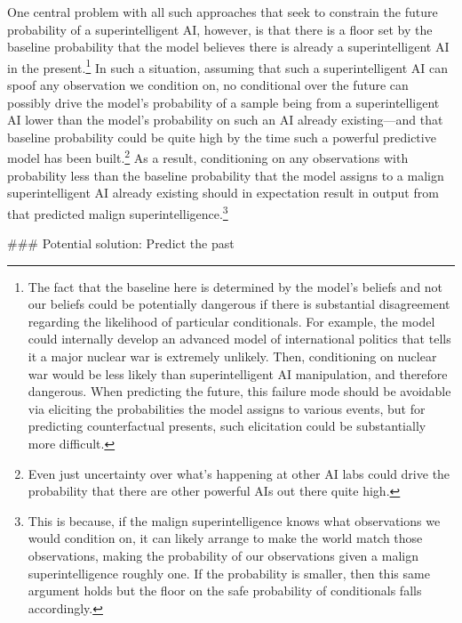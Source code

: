{One central problem with all such approaches that seek to constrain the future probability of a superintelligent AI, however, is that there is a floor set by the baseline probability that the model believes there is already a superintelligent AI in the present.\footnote{The fact that the baseline here is determined by the model's beliefs and not our beliefs could be potentially dangerous if there is substantial disagreement regarding the likelihood of particular conditionals. For example, the model could internally develop an advanced model of international politics that tells it a major nuclear war is extremely unlikely. Then, conditioning on nuclear war would be less likely than superintelligent AI manipulation, and therefore dangerous. When predicting the future, this failure mode should be avoidable via eliciting the probabilities the model assigns to various events, but for predicting counterfactual presents, such elicitation could be substantially more difficult.} In such a situation, assuming that such a superintelligent AI can spoof any observation\cite{TODO: cite https://www.alignmentforum.org/posts/HAz7apopTzozrqW2k/strategy-for-conditioning-generative-models} we condition on, no conditional over the future can possibly drive the model's probability of a sample being from a superintelligent AI lower than the model's probability on such an AI already existing---and that baseline probability could be quite high by the time such a powerful predictive model has been built.\footnote{Even just uncertainty over what's happening at other AI labs could drive the probability that there are other powerful AIs out there quite high.} As a result, conditioning on any observations with probability less than the baseline probability that the model assigns to a malign superintelligent AI already existing should in expectation result in output from that predicted malign superintelligence.\footnote{This is because, if the malign superintelligence knows what observations we would condition on, it can likely arrange to make the world match those observations, making the probability of our observations given a malign superintelligence roughly one. If the probability is smaller, then this same argument holds but the floor on the safe probability of conditionals falls accordingly.}


### Potential solution: Predict the past

}
